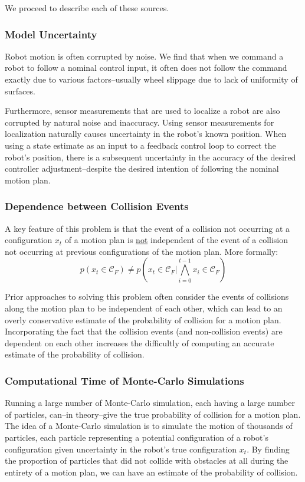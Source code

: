 \documentclass[journal]{IEEEtran}
\begin{document}
We proceed to describe each of these sources.
\subsubsection{Model Uncertainty}
Robot motion is often corrupted by noise. We find that when we command a robot to follow a nominal control input, it often does not follow the command exactly due to various factors--usually wheel slippage due to lack of uniformity of surfaces.

Furthermore, sensor measurements that are used to localize a robot are also corrupted by natural noise and inaccuracy. Using sensor measurements for localization naturally causes uncertainty in the robot's known position. When using a state estimate as an input to a feedback control loop to correct the robot's position, there is a subsequent uncertainty in the accuracy of the desired controller adjustment--despite the desired intention of following the nominal motion plan.

\subsubsection{Dependence between Collision Events}
A key feature of this problem is that the event of a collision not occurring at a configuration $x_t$ of a motion plan is \underline{not} independent of the event of a collision not occurring at previous configurations of the motion plan. More formally:
$$p(x_t \in \mathcal{C}_F) \neq p\left(x_t \in \mathcal{C}_F | \bigwedge\limits_{i=0}^{t-1} x_i \in \mathcal{C}_F \right)$$

Prior approaches to solving this problem often consider the events of collisions along the motion plan to be independent of each other, which can lead to an overly conservative estimate of the probability of collision for a motion plan. Incorporating the fact that the collision events (and non-collision events) are dependent on each other increases the difficultly of computing an accurate estimate of the probability of collision.

\subsubsection{Computational Time of Monte-Carlo Simulations}

Running a large number of Monte-Carlo simulation, each having a large number of particles, can--in theory--give the true probability of collision for a motion plan. The idea of a Monte-Carlo simulation is to simulate the motion of thousands of particles, each particle representing a potential configuration of a robot's configuration given uncertainty in the robot's true configuration $x_t$. By finding the proportion of particles that did not collide with obstacles at all during the entirety of a motion plan, we can have an estimate of the probability of collision.
\end{document}
